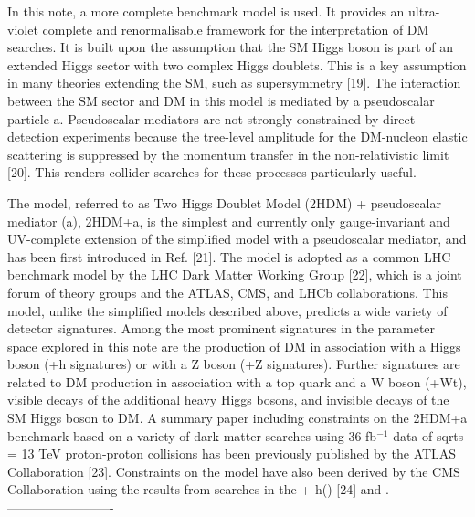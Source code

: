 In this note, a more complete benchmark model is used. It provides an ultra-violet complete and
renormalisable framework for the interpretation of DM searches. It is built upon the assumption that the
SM Higgs boson is part of an extended Higgs sector with two complex Higgs doublets. This is a key
assumption in many theories extending the SM, such as supersymmetry [19]. The interaction between the
SM sector and DM in this model is mediated by a pseudoscalar particle a. Pseudoscalar mediators are not
strongly constrained by direct-detection experiments because the tree-level amplitude for the DM-nucleon
elastic scattering is suppressed by the momentum transfer in the non-relativistic limit [20]. This renders
collider searches for these processes particularly useful.

The model, referred to as Two Higgs Doublet Model (2HDM) + pseudoscalar mediator (a), 2HDM+a, is
the simplest and currently only gauge-invariant and UV-complete extension of the simplified model with a
pseudoscalar mediator, and has been first introduced in Ref. [21]. The model is adopted as a common LHC
benchmark model by the LHC Dark Matter Working Group [22], which is a joint forum of theory groups
and the ATLAS, CMS, and LHCb collaborations. This model, unlike the simplified models described above,
predicts a wide variety of detector signatures. Among the most prominent signatures in the parameter space
explored in this note are the production of DM in association with a Higgs boson (\MET+h signatures) or
with a Z boson (\MET+Z signatures). Further signatures are related to DM production in association with
a top quark and a W boson (\MET+Wt), visible decays of the additional heavy Higgs bosons, and invisible
decays of the SM Higgs boson to DM.
A summary paper including constraints on the 2HDM+a benchmark based on a variety of dark matter
searches using 36 fb$^{-1}$ data of sqrts = 13 TeV proton-proton collisions has been previously published by the
ATLAS Collaboration [23]. Constraints on the model have also been derived by the CMS Collaboration
using the results from searches in the \MET+ h(\bbar) [24] and \MET.
-------------------------
